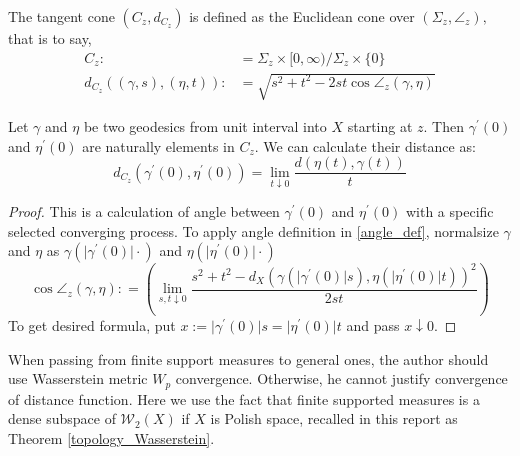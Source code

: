 \begin{defn}
	The tangent cone \( \left( C _ { z } , d _ { C _ { z } } \right) \) is defined as the Euclidean cone over \( \left( \Sigma _ { z } , \angle _ { z } \right) , \)
	that is to say,
	\begin{align*}
		C _ { z }:                                           & = \Sigma _ { z } \times [ 0 , \infty ) / \Sigma _ { z } \times \{ 0 \}          \\
		d _ { C _ { z } } ( ( \gamma , s ) , ( \eta , t ) ): & = \sqrt { s ^ { 2 } + t ^ { 2 } - 2 s t \cos \angle _ { z } ( \gamma , \eta ) }
	\end{align*}
\end{defn}

\begin{thm}
	Let $\gamma$ and  $\eta$ be two geodesics from unit interval into $X$ starting at $z$.  Then $\gamma^\prime(0)$ and $\eta^\prime(0)$ are naturally elements in $C_z$.  We can calculate their distance as:
	\[  d_{C_z}(\gamma^\prime(0),\eta^\prime(0))=\lim _ { t \downarrow 0 } \frac  {d ( \eta ( t ) , \gamma ( t ) )  }{ t }\]
\end{thm}

\begin{proof}
	This is a calculation of angle between $\gamma^\prime(0)$ and $\eta^\prime(0)$ with a specific selected converging process. To apply angle definition in \ref{angle_def}, normalsize $\gamma$ and $\eta$ as $\gamma\left(\vert\gamma^\prime(0)\vert \cdot\right)$ and $\eta\left(\vert\eta^\prime(0)\vert \cdot\right)$
	\[
		\cos\angle _ { z } ( \gamma , \eta ): = \left( \lim _ { s , t \downarrow 0 } \frac { s ^ { 2 } + t ^ { 2 } - d _ { X }\left( \gamma (\vert \gamma^\prime(0)\vert s ) , \eta (\vert \eta^\prime(0)\vert  t ) \right) ^ { 2 } } { 2 s t } \right)
	\]
	To get desired formula, put $ x := \vert  \gamma^\prime(0)\vert s =\vert \eta^\prime(0)\vert t $ and pass $x \downarrow 0$.
\end{proof}

\begin{rmk}
	When passing from finite support measures to general ones, the author should use Wasserstein metric $W_p$ convergence. Otherwise, he cannot justify convergence of distance function. Here we use the fact that finite supported measures is a dense subspace of $\mathscr{W}_2(X)$ if $X$ is Polish space, recalled in this report as Theorem \ref{topology_Wasserstein}.
\end{rmk}
